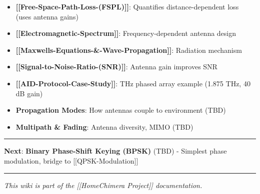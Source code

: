 \begin{itemize}
\tightlist
\item
  \textbf{{[}{[}Free-Space-Path-Loss-(FSPL){]}{]}}: Quantifies
  distance-dependent loss (uses antenna gains)
\item
  \textbf{{[}{[}Electromagnetic-Spectrum{]}{]}}: Frequency-dependent
  antenna design
\item
  \textbf{{[}{[}Maxwell\textquotesingle s-Equations-\&-Wave-Propagation{]}{]}}:
  Radiation mechanism
\item
  \textbf{{[}{[}Signal-to-Noise-Ratio-(SNR){]}{]}}: Antenna gain
  improves SNR
\item
  \textbf{{[}{[}AID-Protocol-Case-Study{]}{]}}: THz phased array example
  (1.875 THz, 40 dB gain)
\item
  \textbf{Propagation Modes}: How antennas couple to environment (TBD)
\item
  \textbf{Multipath \& Fading}: Antenna diversity, MIMO (TBD)
\end{itemize}

\begin{center}\rule{0.5\linewidth}{0.5pt}\end{center}

\textbf{Next}: \textbf{Binary Phase-Shift Keying (BPSK)} (TBD) -
Simplest phase modulation, bridge to {[}{[}QPSK-Modulation{]}{]}

\begin{center}\rule{0.5\linewidth}{0.5pt}\end{center}

\emph{This wiki is part of the {[}{[}Home\textbar Chimera Project{]}{]}
documentation.}
